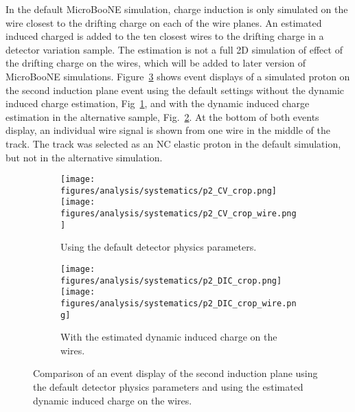     In the default MicroBooNE simulation, charge induction is only simulated on
    the wire closest to the drifting charge on each of the wire planes.  An
    estimated induced charged is added to the ten closest wires to the drifting
    charge in a detector variation sample. The estimation is not a full 2D
    simulation of effect of the drifting charge on the wires, which will be
    added to later version of MicroBooNE simulations. Figure~\ref{fig:dicevd}
    shows event displays of a simulated proton on the second induction plane
    event using the default settings without the dynamic induced charge
    estimation, Fig~\ref{fig:dicevdcv}, and with the dynamic induced charge
    estimation in the alternative sample, Fig.~\ref{fig:dicevddic}. At the
    bottom of both events display, an individual wire signal is shown from one
    wire in the middle of the track.  The track was selected as an NC elastic
    proton in the default simulation, but not in the alternative simulation.
    \begin{figure}[h]
      \centering
      \begin{subfigure}[t]{2.8in}
        \texttt{[image: figures/analysis/systematics/p2\_CV\_crop.png]} \\
        \texttt{[image: figures/analysis/systematics/p2\_CV\_crop\_wire.png]}
        \caption{Using the default detector physics parameters.}
        \label{fig:dicevdcv}
      \end{subfigure}
      \hspace{2pt}
      \begin{subfigure}[t]{2.8in}
        \texttt{[image: figures/analysis/systematics/p2\_DIC\_crop.png]} \\
        \texttt{[image: figures/analysis/systematics/p2\_DIC\_crop\_wire.png]}
        \caption{With the estimated dynamic induced charge on the wires.}
        \label{fig:dicevddic}
      \end{subfigure}
      \caption{Comparison of an event display of the second induction plane
      using the default detector physics parameters and using the estimated
      dynamic induced charge on the
      wires.}
      \label{fig:dicevd}
    \end{figure}

